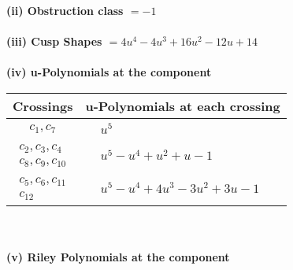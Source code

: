 \documentclass[1p]{elsarticle_modified}
\theoremstyle{definition}
\begin{document}
\flushleft \textbf{(ii) Obstruction class $= -1$}\\~\\
\flushleft \textbf{(iii) Cusp Shapes $= 4 u^4-4 u^3+16 u^2-12 u+14$}\\~\\
\newpage\renewcommand{\arraystretch}{1}
\flushleft \textbf{(iv) u-Polynomials at the component}\newline \\
\begin{tabular}{m{50pt}|m{274pt}}
Crossings & \hspace{64pt}u-Polynomials at each crossing \\
\hline $$\begin{aligned}c_{1},c_{7}\end{aligned}$$&$\begin{aligned}
&u^5
\end{aligned}$\\
\hline $$\begin{aligned}c_{2},c_{3},c_{4}\\c_{8},c_{9},c_{10}\end{aligned}$$&$\begin{aligned}
&u^5- u^4+u^2+u-1
\end{aligned}$\\
\hline $$\begin{aligned}c_{5},c_{6},c_{11}\\c_{12}\end{aligned}$$&$\begin{aligned}
&u^5- u^4+4 u^3-3 u^2+3 u-1
\end{aligned}$\\
\hline
\end{tabular}\\~\\
\newpage\renewcommand{\arraystretch}{1}
\flushleft \textbf{(v) Riley Polynomials at the component}\newline \\
\end{document}
